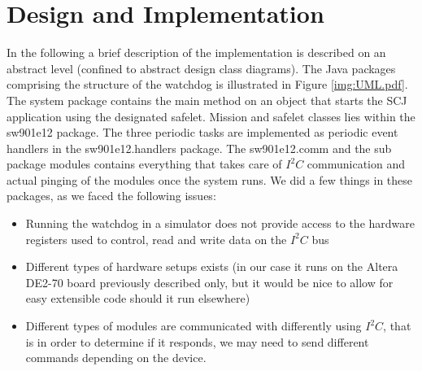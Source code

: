\chapter{Design and Implementation}
In the following a brief description of the implementation is described on an abstract level (confined to abstract design class diagrams). The Java packages comprising the structure of the watchdog is illustrated in Figure \ref{img:UML.pdf}. 
The system package contains the main method on an object that starts the SCJ application using the designated safelet. Mission and safelet classes lies within the sw901e12 package. The three periodic tasks are implemented as periodic event handlers in the sw901e12.handlers package.
The sw901e12.comm and the sub package modules contains everything that takes care of $\textit{I}^2\textit{C}$ communication and actual pinging of the modules once the system runs. We did a few things in these packages, as we faced the following issues:
\begin{itemize}
    \item Running the watchdog in a simulator does not provide access to the hardware registers used to control, read and write data on the $\textit{I}^2\textit{C}$ bus
    \item Different types of hardware setups exists (in our case it runs on the Altera DE2-70 board previously described only, but it would be nice to allow for easy extensible code should it run elsewhere)
    \item Different types of modules are communicated with differently using $\textit{I}^2\textit{C}$, that is in order to determine if it responds, we may need to send different commands depending on the device.
\end{itemize}

